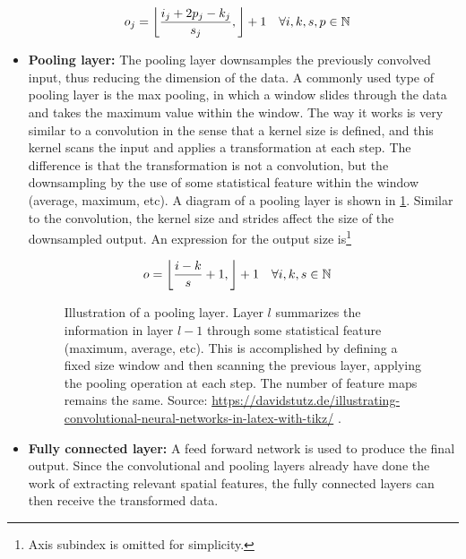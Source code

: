 \begin{itemize}
    \begin{align*}
        o_j &= \left\lfloor \frac{i_j+2p_j-k_j}{s_j}, \right\rfloor+1 \quad \forall i,k,s,p \in \mathbb{N}
    \end{align*}

    \item \textbf{Pooling layer:} The pooling layer downsamples the previously convolved input, thus reducing the dimension of the data. A commonly used type of pooling layer is the max pooling, in which a window slides through the data and takes the maximum value within the window. The way it works is very similar to a convolution in the sense that a kernel size is defined, and this kernel scans the input and applies a transformation at each step. The difference is that the transformation is not a convolution, but the downsampling by the use of some statistical feature within the window (average, maximum, etc). A diagram of a pooling layer is shown in \ref{fig:maxpool}. Similar to the convolution, the kernel size and strides affect the size of the downsampled output. An expression for the output size is\footnote{Axis subindex is omitted for simplicity.} 

    \begin{align*}
        o &= \left\lfloor \frac{i-k}{s}+1, \right\rfloor+1 \quad \forall i,k,s \in \mathbb{N}
    \end{align*}
    
   
    
    \begin{figure}
	\centering
	
	\caption[Illustration of a pooling layer]{Illustration of a pooling layer. Layer $l$ summarizes the information in layer $l-1$ through some statistical feature (maximum, average, etc). This is accomplished by defining a fixed size window and then scanning the previous layer, applying the pooling operation at each step. The number of feature maps remains the same. Source: \url{https://davidstutz.de/illustrating-convolutional-neural-networks-in-latex-with-tikz/} \cite{conv-graphs}.}
	\label{fig:maxpool}
    \end{figure}
    
    \item \textbf{Fully connected layer:} A feed forward network is used to produce the final output. Since the convolutional and pooling layers already have done the work of extracting relevant spatial features, the fully connected layers can then receive the transformed data.
\end{itemize} 

